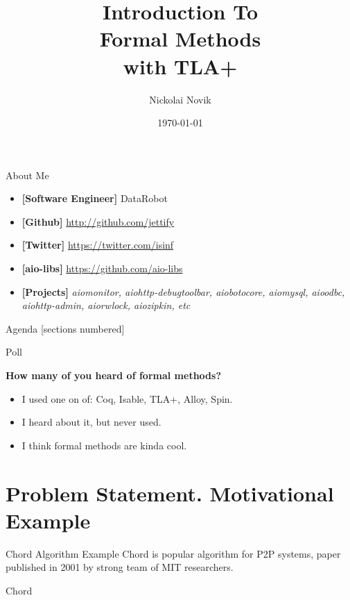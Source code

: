 \documentclass[12pt]{beamer}
\title{Introduction To \\ Formal Methods \\ with TLA+}
\date{\today}
\author{Nickolai Novik}
\institute{\href{http://github.com/jettify}{http://github.com/jettify}}
\begin{document}
  \maketitle
  \begin{frame}{About Me}
    \begin{itemize}
        \item \textbf{[Software Engineer]}  DataRobot
        \item \textbf{[Github]}
            \href{http://github.com/jettify}{http://github.com/jettify}
        \item \textbf{[Twitter]}
            \href{https://twitter.com/isinf}{https://twitter.com/isinf}
        \item \textbf{[aio-libs]}
            \href{https://github.com/aio-libs}{https://github.com/aio-libs}
        \item \textbf{[Projects]}
            \textit{aiomonitor, aiohttp-debugtoolbar,
          aiobotocore, aiomysql, aioodbc, aiohttp-admin, aiorwlock,
          aiozipkin, etc}
    \end{itemize}
  \end{frame}
  \begin{frame}[squeeze]{Agenda}
      [sections numbered]
      \tableofcontents
  \end{frame}
  \begin{frame}{Poll}
      \begin{large}
          \textbf{How many of you heard of formal methods?}
      \end{large}
    \begin{itemize}
      \item I used one on of: Coq, Isable, TLA+, Alloy, Spin.
      \item I heard about it, but never used.
      \item I think formal methods are kinda cool.
    \end{itemize}
  \end{frame}
  \section{Problem Statement. Motivational Example}
  \begin{frame}{Chord Algorithm Example}
      Chord is popular algorithm for P2P systems, paper published in 2001
      by strong team of MIT researchers.
      \cite{stoica2001chord,Zave15}
  \end{frame}
  \begin{frame}{Chord}
  \end{frame}
\end{document}
